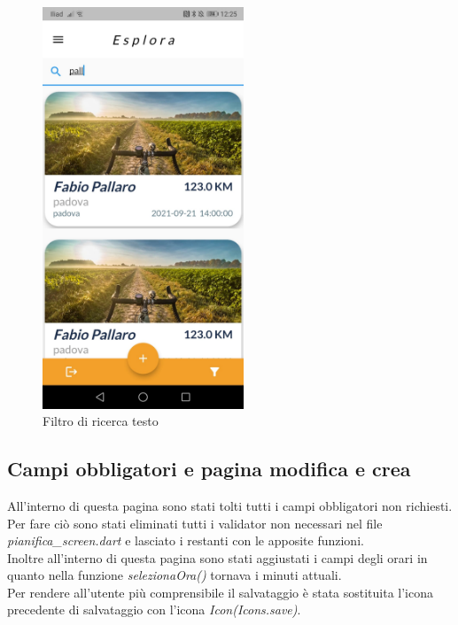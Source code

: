 \begin{figure}[htbp]	
	\centering
	\includegraphics[width=6cm]{immagini/filtrotesto.jpeg}
	\caption{Filtro di ricerca testo}
	\label{fig:Filtro di ricerca testo}
\end{figure}

\newpage

\subsection{Campi obbligatori e pagina modifica e crea}
All'interno di questa pagina sono stati tolti tutti i campi obbligatori non richiesti.\\
Per fare ciò sono stati eliminati tutti i validator non necessari nel file \textit{pianifica\_screen.dart} e lasciato i restanti con le apposite funzioni.\\
Inoltre all'interno di questa pagina sono stati aggiustati i campi degli orari in quanto nella funzione \textit{selezionaOra()} tornava i minuti attuali.\\
Per rendere all'utente più comprensibile il salvataggio è stata sostituita l'icona precedente di salvataggio con l'icona \textit{Icon(Icons.save)}.\\

